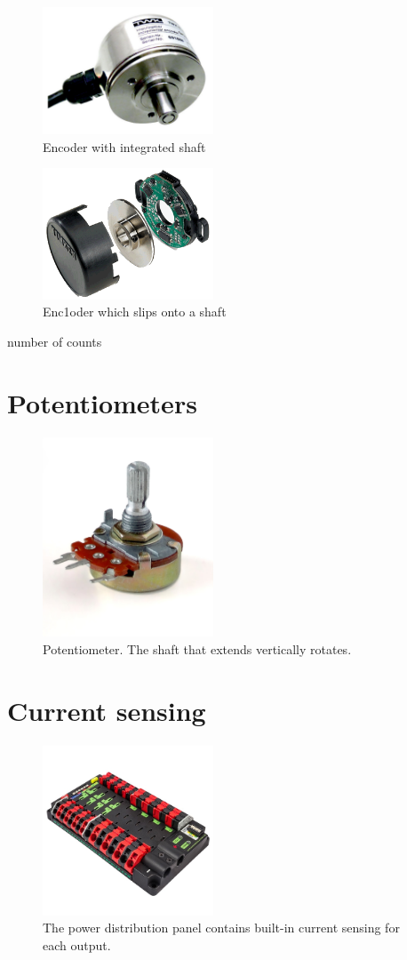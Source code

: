 \documentclass{article}
\begin{document}
\begin{figure}[ht]
\centering
\includegraphics[width=2in]{encoder_shaft.jpg}
\caption{Encoder with integrated shaft}
\end{figure}

\begin{figure}[ht]
\centering
\includegraphics[width=2in]{encoder_slip.png}
\caption{Enc1oder which slips onto a shaft}
\end{figure}

number of counts
\section{Potentiometers}
\begin{figure}[ht]
\centering
\includegraphics[width=2in]{Potentiometer.jpg}
\caption{Potentiometer.  The shaft that extends vertically rotates.}
\end{figure}

\section{Current sensing}
\begin{figure}[ht]
\centering
\includegraphics[width=2in]{pdp.jpg}
\caption{The power distribution panel contains built-in current sensing for each output.}
\end{figure}
\end{document}
